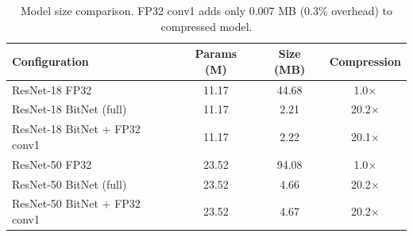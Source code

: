 \begin{table}[h]
\centering
\caption{Model size comparison. FP32 conv1 adds only 0.007 MB (0.3\% overhead) to compressed model.}
\label{tab:model_size}
\begin{tabular}{lccc}
\toprule
Configuration & Params (M) & Size (MB) & Compression \\
\midrule
ResNet-18 FP32 & 11.17 & 44.68 & 1.0$\times$ \\
ResNet-18 BitNet (full) & 11.17 & 2.21 & 20.2$\times$ \\
ResNet-18 BitNet + FP32 conv1 & 11.17 & 2.22 & 20.1$\times$ \\
\midrule
ResNet-50 FP32 & 23.52 & 94.08 & 1.0$\times$ \\
ResNet-50 BitNet (full) & 23.52 & 4.66 & 20.2$\times$ \\
ResNet-50 BitNet + FP32 conv1 & 23.52 & 4.67 & 20.2$\times$ \\
\bottomrule
\end{tabular}
\end{table}